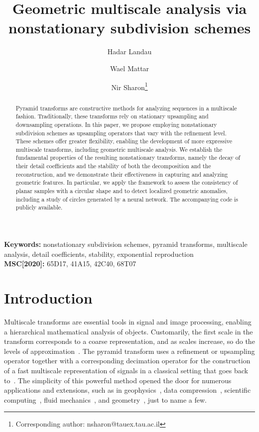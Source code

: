 \documentclass[11pt,a4paper]{article}
\title{Geometric multiscale analysis via nonstationary subdivision schemes}
\author{Hadar Landau}
\author{Wael Mattar}
\author{Nir Sharon\thanks{Corresponding author: nsharon@tauex.tau.ac.il}}
\affil{School of Mathematical Sciences, Tel Aviv University, Tel Aviv, Israel}
\date{}
\theoremstyle{definition}
\begin{document}
\maketitle

\begin{abstract}
Pyramid transforms are constructive methods for analyzing sequences in a multiscale fashion. Traditionally, these transforms rely on stationary upsampling and downsampling operations. In this paper, we propose employing nonstationary subdivision schemes as upsampling operators that vary with the refinement level. These schemes offer greater flexibility, enabling the development of more expressive multiscale transforms, including geometric multiscale analysis. We establish the fundamental properties of the resulting nonstationary transforms, namely the decay of their detail coefficients and the stability of both the decomposition and the reconstruction, and we demonstrate their effectiveness in capturing and analyzing geometric features. In particular, we apply the framework to assess the consistency of planar samples with a circular shape and to detect localized geometric anomalies, including a study of circles generated by a neural network. The accompanying code is publicly available.
\end{abstract}

\vspace{1em}
\noindent\textbf{Keywords:} nonstationary subdivision schemes, pyramid transforms, multiscale analysis, detail coefficients, stability, exponential reproduction \\
\noindent\textbf{MSC[2020]:} 65D17, 41A15, 42C40, 68T07

\section{Introduction}

Multiscale transforms are essential tools in signal and image processing, enabling a hierarchical mathematical analysis of objects. Customarily, the first scale in the transform corresponds to a coarse representation, and as scales increase, so do the levels of approximation~\cite{daubechies1992ten, mallat1999wavelet}. The pyramid transform uses a refinement or upsampling operator together with a corresponding decimation operator for the construction of a fast multiscale representation of signals in a classical setting that goes back to~\cite{donoho1992interpolating, sweldens1996lifting}. The simplicity of this powerful method opened the door for numerous applications and extensions, such as in geophysics~\cite{li2022simple}, data compression~\cite{lv2018novel}, scientific computing~\cite{gillis2022murphy}, fluid mechanics~\cite{de2021hierarchical}, and geometry~\cite{wallner2020geometric}, just to name a few.
\end{document}

